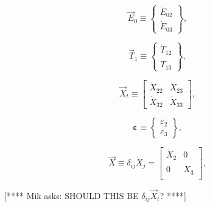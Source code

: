 \begin{equation} \label{eq:E_vec_def}
	\vec{E}_{0} 
	\equiv
	\begin{Bmatrix}
		\dot{E}_{02} \\
		\dot{E}_{03}
	\end{Bmatrix},
\end{equation} 

\begin{equation} \label{eq:T_vec_def}
	\vec{T}_{1} 
	\equiv
	\begin{Bmatrix}
		\dot{T}_{12} \\
		\dot{T}_{13}
	\end{Bmatrix},
\end{equation} 

\begin{equation} \label{eq:X_t_matrix_def}
	\vec{X}_{t} 
	\equiv
	\begin{bmatrix}
		\dot{X}_{22} & \dot{X}_{23} \\
		\dot{X}_{32} & \dot{X}_{33}
	\end{bmatrix},
\end{equation} 

\begin{equation} \label{eq:eps_vec_def}
	\bm{\varepsilon} 
	\equiv
	\begin{Bmatrix}
		\varepsilon_{2}	\\
		\varepsilon_{3}
	\end{Bmatrix},
\end{equation} 

\begin{equation} \label{eq:X_hat_matrix_def}
	\hat{\vec{X}} 
	\equiv
	\delta_{ij} \dot{X}_{j} 
	= 
	\begin{bmatrix}
		\dot{X}_{2}		&	0	  \\
		0				&	\dot{X}_{3}	\\
	\end{bmatrix},
\end{equation} 

[**** Mik asks: SHOULD THIS BE $\delta_{ij}\vec{X}_{t}$? ****]

